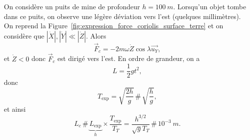                 On considère un puits de mine de profondeur $h=100~m$. Lorsqu'un objet tombe dans ce puits, on observe une légère déviation vers l'est (quelques millimètres). On reprend la Figure~\ref{fig:expression_force_coriolis_surface_terre} et on considère que $\left\lvert\dot{X}\right\rvert,\left\lvert\dot{Y}\right\rvert\ll\left\lvert\dot{Z}\right\rvert$. Alors 
                \begin{equation*}
                    \vec{F}_c=-2m\omega\dot{Z}\cos\lambda \vec{u_Y},
                \end{equation*}
                et $\dot{Z}<0$ donc $\vec{F}_c$ est dirigé vers l'est. En ordre de grandeur, on a 
                \begin{equation*}
                    L=\frac{1}{2}gt^{2},
                \end{equation*}
                donc 
                \begin{equation*}
                    T_{\text{exp}}=\sqrt{\frac{2h}{g}}\,\#\,\sqrt{\frac{h}{g}},
                \end{equation*}
                et ainsi
                \begin{equation*}
                    L_c\,\#\,\underbrace{L_{\text{exp}}}_{h}\times\frac{T_{\text{exp}}}{T_T}=\frac{h^{3/2}}{\sqrt{g}T_T}\,\#\,10^{-3}~m.
                \end{equation*}

                    

            
            

        